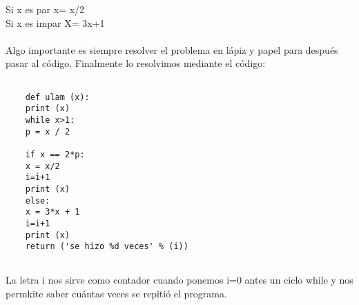 \documentclass{book}
\begin{document}
	Si x es par x= x/2\\
	Si x es impar X= 3x+1 \\
	\\
	Algo importante es siempre resolver el problema en lápiz y papel para después pasar al código. Finalmente lo resolvimos mediante el código:
	\begin{verbatim} 
	
	def ulam (x):
	print (x)		
	while x>1:
	p = x / 2
	
	if x == 2*p:
	x = x/2
	i=i+1
	print (x)
	else:
	x = 3*x + 1
	i=i+1
	print (x)
	return ('se hizo %d veces' % (i))
	
	\end{verbatim}
	La letra i nos sirve como contador cuando ponemos i=0 antes un ciclo while y nos permkite saber cuántas veces se repitió el programa.\\
\end{document}
